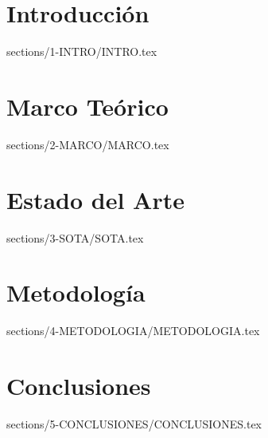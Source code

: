\documentclass{report}
\begin{document}
\newpage
\tableofcontents



\chapter{Introducción}
{sections/1-INTRO/INTRO.tex}

\chapter{Marco Teórico}
{sections/2-MARCO/MARCO.tex}

\chapter{Estado del Arte}
{sections/3-SOTA/SOTA.tex}

\chapter{Metodología}
{sections/4-METODOLOGIA/METODOLOGIA.tex}

\chapter{Conclusiones}
{sections/5-CONCLUSIONES/CONCLUSIONES.tex}








\end{document}
